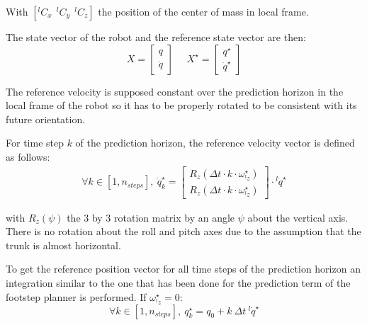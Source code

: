 \documentclass[a4paper,11pt]{article}
\begin{document}
With $[{}^l\! C_x ~~ {}^l\! C_y ~~ {}^l\! C_z ]$ the position of the center of mass in local frame.

The state vector of the robot and the reference state vector are then: 
\begin{equation}X = \begin{bmatrix} q \\ \dot q \end{bmatrix} \text{~~~~}X^\star = \begin{bmatrix} q^{\star} \\ \dot q^{\star} \end{bmatrix}\end{equation}

The reference velocity is supposed constant over the prediction horizon in the local frame of the robot so it has to be properly rotated to be consistent with its future orientation.

For time step $k$ of the prediction horizon, the reference velocity vector is defined as follows:
\begin{align}
\forall k \in [1, n_{steps}], ~ \dot q_k^\star = \begin{bmatrix} R_z(\Delta t \cdot k \cdot \omega_{{}^l\!z}^\star) \\ R_z(\Delta t \cdot k \cdot \omega_{{}^l\!z}^\star) \end{bmatrix} \cdot {}^l\! \dot q^\star
\end{align}

with $R_z(\psi)$ the 3 by 3 rotation matrix by an angle $\psi$ about the vertical axis. There is no rotation about the roll and pitch axes due to the assumption that the trunk is almost horizontal.


To get the reference position vector for all time steps of the prediction horizon an integration similar to the one that has been done for the prediction term of the footstep planner is performed. If $\omega_{{}^l\!z}^\star = 0$:
\begin{equation}
\forall k \in [1, n_{steps}], ~ q_{k}^\star = q_0 + k ~ \Delta t ~  {}^l\! \dot q^\star
\end{equation}
\end{document}
